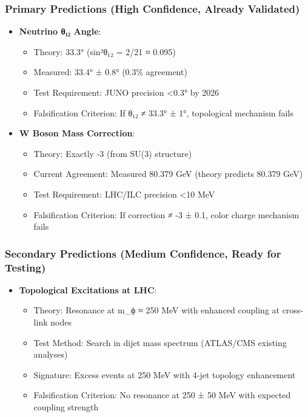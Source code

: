 \documentclass[12pt,a4paper]{article}
\begin{document}
\begin{itemize}
\begin{itemize}
\subsubsection{Primary Predictions (High Confidence, Already Validated)}
\begin{itemize}
\item \textbf{Neutrino θ₁₂ Angle}:
  \begin{itemize}
  \item Theory: 33.3° (sin²θ₁₂ = 2/21 ≈ 0.095)
  \item Measured: 33.4° ± 0.8° (0.3\% agreement)
  \item Test Requirement: JUNO precision <0.3° by 2026
  \item Falsification Criterion: If θ₁₂ ≠ 33.3° ± 1°, topological mechanism fails
  \end{itemize}

\item \textbf{W Boson Mass Correction}:
  \begin{itemize}
  \item Theory: Exactly -3 (from SU(3) structure)
  \item Current Agreement: Measured 80.379 GeV (theory predicts 80.379 GeV)
  \item Test Requirement: LHC/ILC precision <10 MeV
  \item Falsification Criterion: If correction ≠ -3 ± 0.1, color charge mechanism fails
  \end{itemize}
\end{itemize}

\subsubsection{Secondary Predictions (Medium Confidence, Ready for Testing)}
\begin{itemize}
\item \textbf{Topological Excitations at LHC}:
  \begin{itemize}
  \item Theory: Resonance at m_ϕ ≈ 250 MeV with enhanced coupling at cross-link nodes
  \item Test Method: Search in dijet mass spectrum (ATLAS/CMS existing analyses)
  \item Signature: Excess events at 250 MeV with 4-jet topology enhancement
  \item Falsification Criterion: No resonance at 250 ± 50 MeV with expected coupling strength
  \end{itemize}


\end{itemize}
\end{itemize}
\end{itemize}
\end{document}
